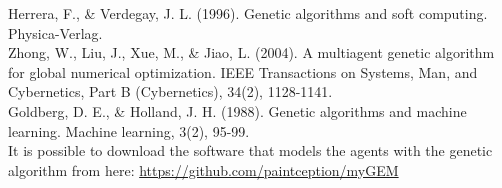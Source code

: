 \documentclass[a4paper]{article}
\begin{document}
Herrera, F., \& Verdegay, J. L. (1996). Genetic algorithms and soft computing. Physica-Verlag. \\

Zhong, W., Liu, J., Xue, M., \& Jiao, L. (2004). A multiagent genetic algorithm for global numerical optimization. IEEE Transactions on Systems, Man, and Cybernetics, Part B (Cybernetics), 34(2), 1128-1141. \\

Goldberg, D. E., \& Holland, J. H. (1988). Genetic algorithms and machine learning. Machine learning, 3(2), 95-99. \\

It is possible to download the software that models the agents with the genetic algorithm from here: \url{https://github.com/paintception/myGEM}
\end{document}
